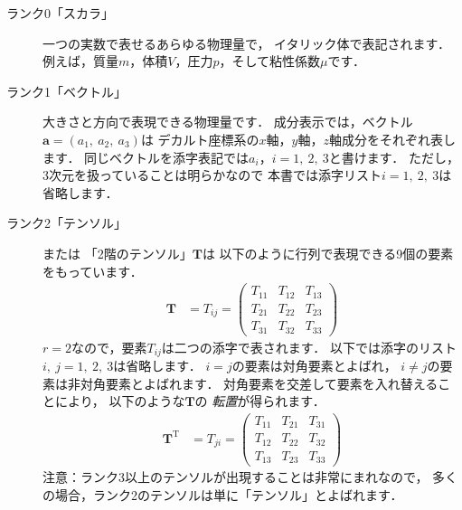\begin{description}
 \item[ランク0「スカラ」] 一つの実数で表せるあらゆる物理量で，
            イタリック体で表記されます．
            例えば，質量$m$，体積$V$，圧力$p$，そして粘性係数$\mu$です．
 \item[ランク1「ベクトル」] 大きさと方向で表現できる物理量です．
            成分表示では，ベクトル$\bm{a} = (a_{1},\ a_{2},\ a_{3})$は
            デカルト座標系の$x$軸，$y$軸，$z$軸成分をそれぞれ表します．
            同じベクトルを添字表記では$a_{i}$，$i = 1,\ 2,\ 3$と書けます．
            ただし，3次元を扱っていることは明らかなので
            本書では添字リスト$i = 1,\ 2,\ 3$は省略します．
 \item[ランク2「テンソル」] または
%
「2階のテンソル」$\bm{T}$は
            以下のように行列で表現できる9\nobreak 個の要素をもっています．
            \begin{align}
             \label{eq:1.1}
             \bm{T} &= T_{ij}
             = \begin{pmatrix}
                T_{11} & T_{12} & T_{13} \\
                T_{21} & T_{22} & T_{23} \\
                T_{31} & T_{32} & T_{33}
               \end{pmatrix}
            \end{align}
            $r = 2$なので，要素$T_{ij}$は二つの添字で表されます．
            以下では添字のリスト$i,\ j = 1,\ 2,\ 3$は省略します．
            $i = j$の要素は対角要素とよばれ，
            $i \ne j$の要素は非対角要素とよばれます．
            対角要素を交差して要素を入れ替えることにより，
            以下のような$\bm{T}$の
%
\emph{転置}が得られます．
            \begin{align}
             \label{eq:1.2}
             \bm{T}^{\mathrm{T}} &= T_{ji}
             = \begin{pmatrix}
                T_{11} & T_{21} & T_{31} \\
                T_{12} & T_{22} & T_{32} \\
                T_{13} & T_{23} & T_{33}
               \end{pmatrix}
            \end{align}
            注意：ランク3以上のテンソルが出現することは非常にまれなので，
            多くの場合，ランク2のテンソルは単に「テンソル」とよばれます．

\end{description}

